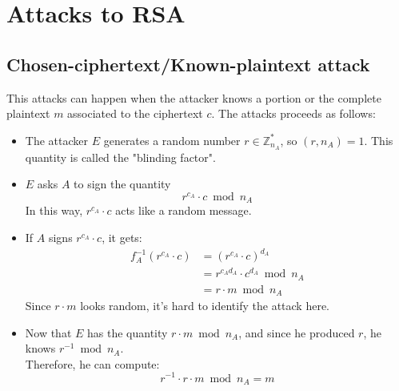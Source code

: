 \section{Attacks to RSA}
\subsection{Chosen-ciphertext/Known-plaintext attack}
This attacks can happen when the attacker knows a portion or the complete plaintext $m$ associated to the ciphertext $c$.\newline
The attacks proceeds as follows:
\begin{itemize}
    \item The attacker $E$ generates a random number $r \in \mathbb{Z}_{n_{A}}^{*}$, so $(r, n_{A}) = 1$. This quantity is called the "blinding factor".
    \item $E$ asks $A$ to sign the quantity
    \[r^{c_{A}} \cdot c \bmod n_{A}\]
    In this way, $r^{c_{A}} \cdot c$ acts like a random message.
    \item If $A$ signs $r^{c_{A}} \cdot c$, it gets:
    \begin{align*}
        f_{A}^{-1}(r^{c_{A}} \cdot c) &= (r^{c_{A}} \cdot c)^{d_{A}} \\
        &= r^{c_{A}d_{A}} \cdot c^{d_{A}} \bmod n_{A} \\
        &= r \cdot m \bmod n_{A}
    \end{align*}
    Since $r \cdot m$ looks random, it's hard to identify the attack here.
    \item Now that $E$ has the quantity $r \cdot m \bmod n_{A}$, and since he produced $r$, he knows $r^{-1} \bmod n_{A}$.\\
    Therefore, he can compute:
    \[r^{-1} \cdot r \cdot m \bmod n_{A} = m\]
\end{itemize}

